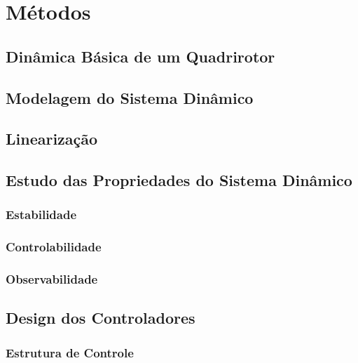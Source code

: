 \section{Métodos}

\subsection{Dinâmica Básica de um Quadrirotor}
\lipsum[1]

\subsection{Modelagem do Sistema Dinâmico}
\lipsum[1]

\subsection{Linearização}
\lipsum[1]

\subsection{Estudo das Propriedades do Sistema Dinâmico}
\lipsum[1]

\subsubsection{Estabilidade}
\lipsum[1]

\subsubsection{Controlabilidade}
\lipsum[1]

\subsubsection{Observabilidade}
\lipsum[1]

\subsection{Design dos Controladores}
\lipsum[1]

\subsubsection{Estrutura de Controle}
\lipsum[1]

\lipsum[1]

\lipsum[1]

